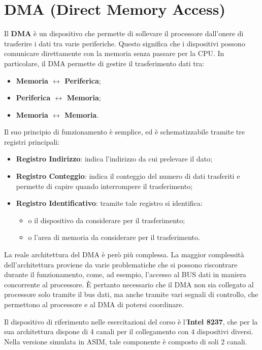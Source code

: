 \section{DMA (Direct Memory Access)}\label{par:DMA}

Il \textbf{DMA} è un dispositivo che permette di sollevare il processore dall'onere di trasferire i dati tra varie periferiche. Questo significa che i dispositivi possono comunicare direttamente con la memoria senza passare per la CPU. In particolare, il DMA permette di gestire il trasferimento dati tra:
\begin{itemize}
    \item \textbf{Memoria $\leftrightarrow$ Periferica};
    \item \textbf{Periferica $\leftrightarrow$ Memoria};
    \item \textbf{Memoria $\leftrightarrow$ Memoria}.
\end{itemize}

Il suo principio di funzionamento è semplice, ed è schematizzabile tramite tre registri principali:
\begin{itemize}
    \item \textbf{Registro Indirizzo}: indica l'indirizzo da cui prelevare il dato;
    \item \textbf{Registro Conteggio}: indica il conteggio del numero di dati trasferiti e permette di capire quando interrompere il trasferimento;
    \item \textbf{Registro Identificativo}: tramite tale registro si identifica:
    \begin{itemize}
        \item o il dispositivo da considerare per il trasferimento;
        \item o l'area di memoria da considerare per il trasferimento.
    \end{itemize}  
\end{itemize}

La reale architettura del DMA è però più complessa. La maggior complessità dell'architettura proviene da varie problematiche che si possono riscontrare durante il funzionamento, come, ad esempio, l'accesso al BUS dati in maniera concorrente al processore. \uppercase{È} pertanto necessario che il DMA non sia collegato al processore solo tramite il bus dati, ma anche tramite vari segnali di controllo, che permettono al processore e al DMA di potersi coordinare.

Il dispositivo di riferimento nelle esercitazioni del corso è l'\textbf{Intel 8237}, che per la sua architettura dispone di 4 canali per il collegamento con 4 dispositivi diversi. Nella versione simulata in ASIM, tale componente è composto di soli 2 canali.

